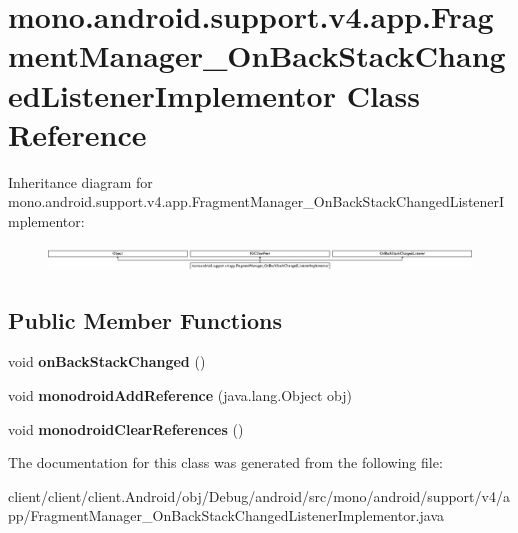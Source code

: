 \hypertarget{classmono_1_1android_1_1support_1_1v4_1_1app_1_1FragmentManager__OnBackStackChangedListenerImplementor}{}\section{mono.\+android.\+support.\+v4.\+app.\+Fragment\+Manager\+\_\+\+On\+Back\+Stack\+Changed\+Listener\+Implementor Class Reference}
\label{classmono_1_1android_1_1support_1_1v4_1_1app_1_1FragmentManager__OnBackStackChangedListenerImplementor}
Inheritance diagram for mono.\+android.\+support.\+v4.\+app.\+Fragment\+Manager\+\_\+\+On\+Back\+Stack\+Changed\+Listener\+Implementor\+:\begin{figure}[H]
\begin{center}
\leavevmode
\includegraphics[height=0.691358cm]{classmono_1_1android_1_1support_1_1v4_1_1app_1_1FragmentManager__OnBackStackChangedListenerImplementor}
\end{center}
\end{figure}
\subsection*{Public Member Functions}
\begin{DoxyCompactItemize}
\item 
\hypertarget{classmono_1_1android_1_1support_1_1v4_1_1app_1_1FragmentManager__OnBackStackChangedListenerImplementor_aac1b73d05317d86e387f0387b87775df}{}void {\bfseries on\+Back\+Stack\+Changed} ()\label{classmono_1_1android_1_1support_1_1v4_1_1app_1_1FragmentManager__OnBackStackChangedListenerImplementor_aac1b73d05317d86e387f0387b87775df}

\item 
\hypertarget{classmono_1_1android_1_1support_1_1v4_1_1app_1_1FragmentManager__OnBackStackChangedListenerImplementor_a685912956810c558e72f6494db349d6e}{}void {\bfseries monodroid\+Add\+Reference} (java.\+lang.\+Object obj)\label{classmono_1_1android_1_1support_1_1v4_1_1app_1_1FragmentManager__OnBackStackChangedListenerImplementor_a685912956810c558e72f6494db349d6e}

\item 
\hypertarget{classmono_1_1android_1_1support_1_1v4_1_1app_1_1FragmentManager__OnBackStackChangedListenerImplementor_a4272051b3b8101262d9ec7d0aedcc515}{}void {\bfseries monodroid\+Clear\+References} ()\label{classmono_1_1android_1_1support_1_1v4_1_1app_1_1FragmentManager__OnBackStackChangedListenerImplementor_a4272051b3b8101262d9ec7d0aedcc515}

\end{DoxyCompactItemize}


The documentation for this class was generated from the following file\+:\begin{DoxyCompactItemize}
\item 
client/client/client.\+Android/obj/\+Debug/android/src/mono/android/support/v4/app/Fragment\+Manager\+\_\+\+On\+Back\+Stack\+Changed\+Listener\+Implementor.\+java\end{DoxyCompactItemize}
